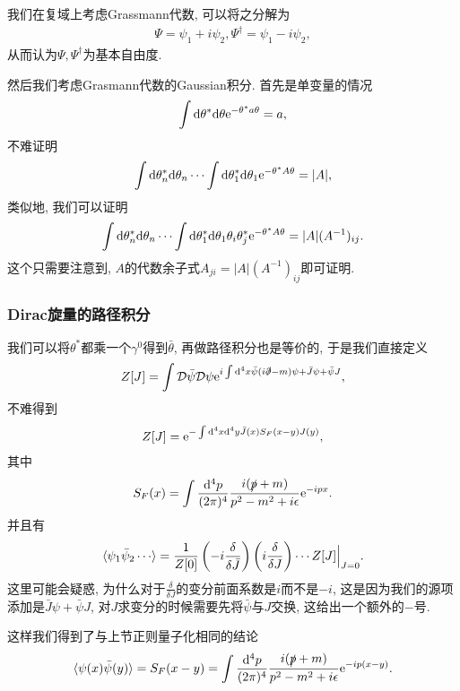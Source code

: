 我们在复域上考虑Grassmann代数, 可以将之分解为
\begin{align}
    \Psi=\psi_1+i\psi_2, \Psi^\dagger=\psi_1-i\psi_2,
\end{align}
从而认为$\Psi, \Psi^\dagger$为基本自由度.

然后我们考虑Grasmann代数的Gaussian积分. 首先是单变量的情况
\begin{align}
    \int\mathrm d\theta^*\mathrm d\theta\mathrm e^{-\theta^*a\theta}=a,
\end{align}
不难证明
\begin{align}
    \int\mathrm d\theta^*_n\mathrm d\theta_n\cdots\int\mathrm d\theta^*_1\mathrm d\theta_1\mathrm e^{-\mathbf{\theta}^*A\mathbf{\theta}}=|A|,
\end{align}
类似地, 我们可以证明
\begin{align}
    \int\mathrm d\theta^*_n\mathrm d\theta_n\cdots\int\mathrm d\theta^*_1\mathrm d\theta_1\theta_i\theta_j^*\mathrm e^{-\mathbf{\theta}^*A\mathbf{\theta}}=|A|(A^{-1})_{ij}.
\end{align}
这个只需要注意到, $A$的代数余子式$A_{ji}=|A|(A^{-1})_{ij}$即可证明.

\subsubsection{Dirac旋量的路径积分}
我们可以将$\theta^*$都乘一个$\gamma^0$得到$\bar\theta$, 再做路径积分也是等价的, 于是我们直接定义
\begin{align}
    Z[J]=\int\mathcal D\bar\psi\mathcal D\psi\mathrm e^{i\int\mathrm d^4x\bar\psi(i\slashed\partial-m)\psi+\bar J\psi+\bar\psi J},
\end{align}
不难得到
\begin{align}
    Z[J]=\mathrm e^{-\int\mathrm d^4x\mathrm d^4y\bar J(x)S_F(x-y)J(y)},
\end{align}
其中
\begin{align}
    S_F(x)=\int\frac{\mathrm d^4p}{(2\pi)^4}\frac{i(\slashed p+m)}{p^2-m^2+i\epsilon}\mathrm e^{-ipx}.
\end{align}
并且有
\begin{align}
    \braket{\psi_1\bar\psi_2\cdots}=\frac1{Z[0]}\left(-i\frac{\delta}{\delta\bar J}\right)\left(i\frac{\delta}{\delta J}\right)\cdots Z[J]\Big|_{J=0}.
\end{align}
这里可能会疑惑, 为什么对于$\frac{\delta}{\delta J}$的变分前面系数是$i$而不是$-i$, 这是因为我们的源项添加是$\bar J\psi+\bar\psi J$, 对$J$求变分的时候需要先将$\bar\psi$与$J$交换, 这给出一个额外的$-$号.

这样我们得到了与上节正则量子化相同的结论
\begin{align}
    \braket{\psi(x)\bar\psi(y)}=S_F(x-y)=\int\frac{\mathrm d^4p}{(2\pi)^4}\frac{i(\slashed p+m)}{p^2-m^2+i\epsilon}\mathrm e^{-ip(x-y)}.
\end{align}

